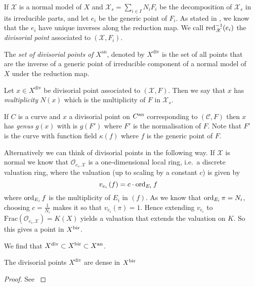 If $\mathscr X$ is a normal model of $X$ and $\mathscr X_s = \sum_{i \in I} N_i F_i$ be the decomposition of $\mathscr X_s$ in its irreducible parts, and let $e_i$ be the generic point of $F_i$. 
As stated in \cite[thm 2.2.4]{berkovichSpectralTheoryAnalytic2012}, we know that the $e_i$ have unique inverses along the reduction map. 
We call $\operatorname{red}_{\mathscr X}^{-1}(e_i)$ the \emph{divisorial point} associated to $(\mathscr X, F_i)$.
\begin{definition}
	The \emph{set of divisorial points of $X^\mathrm{an}$}, denoted by  $X^{\text{div}}$ is the set of all points that are the inverse of a generic point of irreducible component of a normal model of $X$ under the reduction map. 
\end{definition} 
\begin{definition}
	Let $x \in X^{\text{div}}$ be divisorial point associated to $(\mathscr X, F)$. 
	Then we say that $x$ has \emph{multiplicity} $N(x)$ which is the multiplicity of $F$ in $\mathscr X_s$. 
\end{definition}
\begin{definition}
	If $C$ is a curve and $x$ a divisorial point on $C{}^{\text{an}}$ corresponding to $(\mathscr C, F)$ then $x$ has \emph{genus} $g(x)$ with is $g(F')$ where $F'$ is the normalisation of $F$. 
	Note that $F'$ is the curve with function field  $\kappa(f)$ where $f$ is the generic point of $F$. 
\end{definition}
Alternatively we can think of divisorial points in the following way. 
If  $\mathscr X$ is normal we know that $\mathcal{O}_{e_i, \mathscr X}$ is a one-dimensional local ring, i.e.\ a discrete valuation ring, where the valuation (up to scaling by a constant $c$) is given by \[
	v_{e_i}\left( f \right)  = c\cdot \operatorname{ord}_{E_i} f
\] 
where $\operatorname{ord}_{E_i} f$ is the multiplicity of $E_i$ in $(f)$. 
As we know that  $\operatorname{ord}_{E_i} \pi = N_i$, choosing $c = \frac{1}{N_i}$ makes it so that $v_{e_i}(\pi) = 1$. 
Hence extending $v_{e_i}$ to $\mathrm{Frac}(\mathcal{O}_{e_i, \mathscr X}) = K(X)$ yields a valuation that extends the valuation on $K$. 
So this gives a point in $X{}^{\text{bir}}$. 

We find that $X^{\text{div}} \subset X{}^{\text{bir}} \subset X{}^{\text{an}}$. 
\begin{lemma}
	The divisorial points $X^{\text{div}}$ are dense in $X{}^{\text{bir}}$  
\end{lemma}
\begin{proof}
	See \cite[prop.\ 2.4.9]{mustataWeightFunctionsNonArchimedean2015}
\end{proof}


